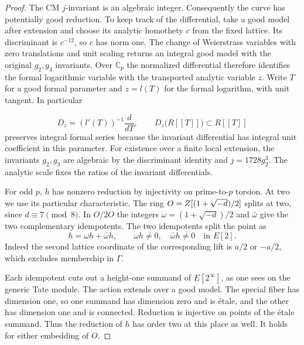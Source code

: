 \begin{proof}
The CM \(j\)-invariant is an algebraic integer. Consequently
the curve has potentially good reduction. To keep track of
the differential, take a good model after extension and choose
its analytic homothety \(c\) from the fixed lattice. Its
discriminant is \(c^{-12}\), so \(c\) has norm one. The change
of Weierstrass variables with zero translations and unit scaling
returns an integral good model with the original \(g_2,g_3\)
invariants. Over \(\mathbb C_p\) the normalized differential
therefore identifies the formal logarithmic variable with the
transported analytic variable \(z\). Write \(T\) for a good
formal parameter and \(z=l(T)\) for the formal logarithm,
with unit tangent. In particular

\[
  D_z=(l'(T))^{-1}\frac{d}{dT},\qquad D_z\big(R[\![T]\!]\big)\subset R[\![T]\!]
\]
 preserves integral formal series
because the invariant differential has integral unit coefficient
in this parameter. For existence over a finite local extension,
the invariants \(g_2,g_3\) are algebraic by the discriminant
identity and \(j=1728g_2^3\). The analytic scale fixes the
ratios of the invariant differentials. \cite{cm-reciprocity,serre-tate}


For odd \(p\), \(h\) has nonzero reduction by injectivity on
prime-to-\(p\) torsion. At two we use its particular
characteristic. The ring \(O=Z[(1+\sqrt{-d})/2]\) splits at two,
since \(d\equiv7\pmod8\). In \(O/2O\) the integers
\(\omega=(1+\sqrt{-d})/2\) and \(\bar\omega\) give the
two complementary idempotents. The two idempotents split the point as
\[
       h=\omega h+\bar\omega h,\qquad
       \omega h\ne0,\quad\bar\omega h\ne0\quad\text{in }E[2].
\]
Indeed the second lattice coordinate of the corresponding lift
is \(a/2\) or \(-a/2\), which excludes membership in \(\Gamma\).

Each idempotent cuts out a height-one summand of
\(E[2^\infty]\), as one sees on the generic Tate module.
The action extends over a good model. The special fiber has
dimension one, so one summand has dimension zero and is
\'{e}tale, and the other has dimension one and is connected.
Reduction is injective on points of the \'etale summand.
Thus the reduction of \(h\) has order two at this place as
well.  It holds for either embedding of \(O\).


\end{proof}
